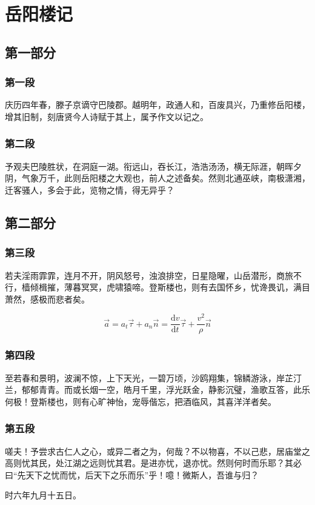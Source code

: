 
\section{岳阳楼记}\label{sec:test}
\subsection{第一部分}
\subsubsection{第一段}
庆历四年春，滕子京谪守巴陵郡。越明年，政通人和，百废具兴，乃重修岳阳楼，增其旧制，刻唐贤今人诗赋于其上，属予作文以记之。

\subsubsection{第二段}
予观夫巴陵胜状，在洞庭一湖。衔远山，吞长江，浩浩汤汤，横无际涯，朝晖夕阴，气象万千，此则岳阳楼之大观也，前人之述备矣。然则北通巫峡，南极潇湘，迁客骚人，多会于此，览物之情，得无异乎？

\subsection{第二部分}
\subsubsection{第三段}
若夫淫雨霏霏，连月不开，阴风怒号，浊浪排空，日星隐曜，山岳潜形，商旅不行，樯倾楫摧，薄暮冥冥，虎啸猿啼。登斯楼也，则有去国怀乡，忧谗畏讥，满目萧然，感极而悲者矣。

\begin{equation}
    \vec{a}=a_t\vec{\tau}+a_n\vec{n}=\frac{\mathrm{d}v}{\mathrm{d}t}\vec{\tau}+\frac{v^2}{\rho}\vec{n}
\end{equation}

\subsubsection{第四段}
至若春和景明，波澜不惊，上下天光，一碧万顷，沙鸥翔集，锦鳞游泳，岸芷汀兰，郁郁青青。而或长烟一空，皓月千里，浮光跃金，静影沉璧，渔歌互答，此乐何极！登斯楼也，则有心旷神怡，宠辱偕忘，把酒临风，其喜洋洋者矣。

\subsubsection{第五段}
嗟夫！予尝求古仁人之心，或异二者之为，何哉？不以物喜，不以己悲，居庙堂之高则忧其民，处江湖之远则忧其君。是进亦忧，退亦忧。然则何时而乐耶？其必曰“先天下之忧而忧，后天下之乐而乐”乎！噫！微斯人，吾谁与归？

时六年九月十五日。
